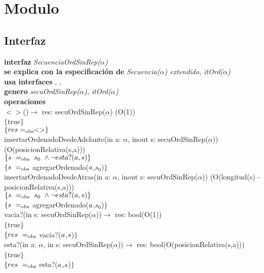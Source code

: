 \section*{Modulo }

\subsection*{Interfaz}
\textbf{interfaz} \textit{SecuenciaOrdSinRep($\alpha$)}\\
\textbf{se explica con la especificaci\'on de} \textit{Secuencia($\alpha$) extendido, itOrd($\alpha$)}\\
\textbf{usa interfaces} , \nombretad{$\alpha$}, \\
\textbf{genero} \textit{secuOrdSinRep($\alpha$), itOrd($\alpha$)}\\

\textbf{operaciones}\\

$<>$()$\longrightarrow$ res: secuOrdSinRep($\alpha$) \hfill (O(1))\\
$\{$true$\}$\\
$\{{res} =_{\mathrm{obs}} <> \}$\\

insertarOrdenadoDesdeAdelante(in a: $\alpha$, inout s: secuOrdSinRep($\alpha$)) \hfill (O(posicionRelativa(s,a)))\\
$\{{s}\ =_{\mathrm{obs}}\ s_0\ \wedge \neg esta?(a,s) \}$\\
$\{{s}\ =_{\mathrm{obs}}$ agregarOrdenado(${a}$,$s_0$)$\}$\\

insertarOrdenadoDesdeAtras(in a: $\alpha$, inout s: secuOrdSinRep($\alpha$))  (O(longitud(s) - posicionRelativa(s,a)))\\
$\{{s}\ =_{\mathrm{obs}}\ s_0\ \wedge \neg esta?(a,s) \}$\\
$\{{s}\ =_{\mathrm{obs}}$ agregarOrdenado(${a}$,$s_0$)$\}$\\

vacia?(in s: secuOrdSinRep($\alpha$))$\longrightarrow$ res: bool\hfill (O(1))\\
$\{$true$\}$\\
$\{{res}\ =_{\mathrm{obs}}$ vacia?(${a}$,${s}$)$\}$\\

esta?(in a: $\alpha$, in s: secuOrdSinRep($\alpha$))$\longrightarrow$ res: bool\hfill (O(posicionRelativa(s,a)))\\
$\{$true$\}$\\
$\{{res}\ =_{\mathrm{obs}}$ esta?(${a}$,${s}$)$\}$\\

